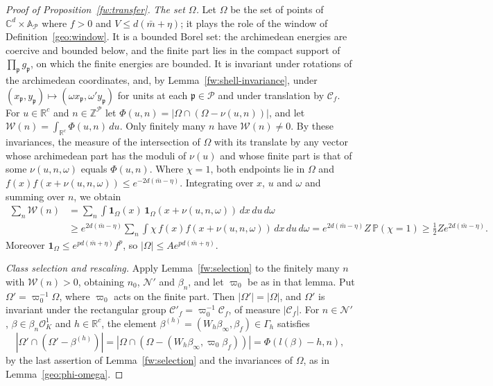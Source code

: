 \documentclass[11pt]{amsart}
\numberwithin{equation}{section}
\theoremstyle{definition}
\theoremstyle{remark}
\newcommand{\R}{\mathbb R}
\newcommand{\C}{\mathbb C}
\newcommand{\Z}{\mathbb Z}
\begin{document}
\begin{proof}[Proof of Proposition~\ref{fw:transfer}]
\emph{The set $\Omega$.} Let $\Omega$ be the set of points of
$\C^d\times\mathbb A_{\mathcal P}$ where $f>0$ and $V\le d(\bar m+\eta)$;
it plays the role of the window of Definition~\ref{geo:window}. It is a
bounded Borel set: the archimedean energies are coercive and bounded
below, and the finite part lies in the compact support of
$\prod_{\mathfrak p}g_{\mathfrak p}$, on which the finite energies are
bounded. It is invariant under rotations of the archimedean
coordinates, and, by Lemma~\ref{fw:shell-invariance}, under
$(x_{\mathfrak p},y_{\mathfrak p})\mapsto(\omega x_{\mathfrak
p},\omega'y_{\mathfrak p})$ for units at each $\mathfrak p\in\mathcal P$
and under translation by $\mathcal C_f$. For $u\in\R^c$ and
$n\in\Z^{\mathcal P}$ let $\Phi(u,n)=|\Omega\cap(\Omega-\nu(u,n))|$, and
let $\mathcal W(n)=\int_{\R^c}\Phi(u,n)\,du$. Only finitely many $n$ have
$\mathcal W(n)\ne0$. By these invariances, the measure of the
intersection of $\Omega$ with its translate by any vector whose
archimedean part has the moduli of $\nu(u)$ and whose finite part is
that of some $\nu(u,n,\omega)$ equals $\Phi(u,n)$. Where $\chi=1$, both
endpoints lie in $\Omega$ and $f(x)f(x+\nu(u,n,\omega))\le
e^{-2d(\bar m-\eta)}$. Integrating over $x$, $u$ and $\omega$ and
summing over $n$, we obtain
\[
 \begin{split}
 \sum_n\mathcal W(n)
 &=\sum_n\int\mathbf 1_\Omega(x)\,\mathbf 1_\Omega(x+\nu(u,n,\omega))\,
 dx\,du\,d\omega\\
 &\ge e^{2d(\bar m-\eta)}\sum_n\int\chi\,f(x)f(x+\nu(u,n,\omega))\,
 dx\,du\,d\omega
 =e^{2d(\bar m-\eta)}Z\,\mathbb P(\chi=1)
 \ge\tfrac12Ze^{2d(\bar m-\eta)} .
 \end{split}
\]
Moreover $\mathbf 1_\Omega\le e^{pd(\bar m+\eta)}f^p$, so
$|\Omega|\le Ae^{pd(\bar m+\eta)}$.

\emph{Class selection and rescaling.} Apply Lemma~\ref{fw:selection} to
the finitely many $n$ with $\mathcal W(n)>0$, obtaining $n_0$,
$\mathcal N'$ and $\beta_n$, and let $\varpi_0$ be as in that lemma.
Put $\Omega'=\varpi_0^{-1}\Omega$, where $\varpi_0$ acts on the finite
part. Then $|\Omega'|=|\Omega|$, and $\Omega'$ is invariant under the
rectangular group $\mathcal C'_f=\varpi_0^{-1}\mathcal C_f$, of measure
$|\mathcal C_f|$. For $n\in\mathcal N'$, $\beta\in\beta_n\mathcal O_K^1$
and $h\in\R^c$, the element $\beta^{(h)}=(W_h\beta_\infty,\beta_f)\in
\Gamma_h$ satisfies
\[
 |\Omega'\cap(\Omega'-\beta^{(h)})|=|\Omega\cap(\Omega-(W_h\beta_\infty,
 \varpi_0\beta_f))|=\Phi(l(\beta)-h,n),
\]
by the last assertion of Lemma~\ref{fw:selection} and the invariances of
$\Omega$, as in Lemma~\ref{geo:phi-omega}.


\end{proof}
\end{document}
